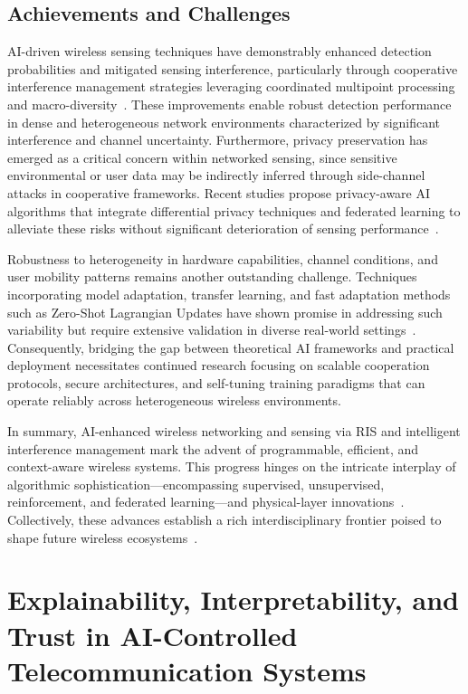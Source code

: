 \documentclass[sigconf]{acmart}
\begin{document}
\subsection{Achievements and Challenges}

AI-driven wireless sensing techniques have demonstrably enhanced detection probabilities and mitigated sensing interference, particularly through cooperative interference management strategies leveraging coordinated multipoint processing and macro-diversity~\cite{ref41,ref42,ref48}. These improvements enable robust detection performance in dense and heterogeneous network environments characterized by significant interference and channel uncertainty. Furthermore, privacy preservation has emerged as a critical concern within networked sensing, since sensitive environmental or user data may be indirectly inferred through side-channel attacks in cooperative frameworks. Recent studies propose privacy-aware AI algorithms that integrate differential privacy techniques and federated learning to alleviate these risks without significant deterioration of sensing performance~\cite{ref43,ref48}.

Robustness to heterogeneity in hardware capabilities, channel conditions, and user mobility patterns remains another outstanding challenge. Techniques incorporating model adaptation, transfer learning, and fast adaptation methods such as Zero-Shot Lagrangian Updates have shown promise in addressing such variability but require extensive validation in diverse real-world settings~\cite{ref44,ref45}. Consequently, bridging the gap between theoretical AI frameworks and practical deployment necessitates continued research focusing on scalable cooperation protocols, secure architectures, and self-tuning training paradigms that can operate reliably across heterogeneous wireless environments.

\bigskip

In summary, AI-enhanced wireless networking and sensing via RIS and intelligent interference management mark the advent of programmable, efficient, and context-aware wireless systems. This progress hinges on the intricate interplay of algorithmic sophistication—encompassing supervised, unsupervised, reinforcement, and federated learning—and physical-layer innovations~\cite{ref49}. Collectively, these advances establish a rich interdisciplinary frontier poised to shape future wireless ecosystems~\cite{ref41,ref42,ref43,ref44,ref45,ref48,ref49}.

\section{Explainability, Interpretability, and Trust in AI-Controlled Telecommunication Systems}
\end{document}

